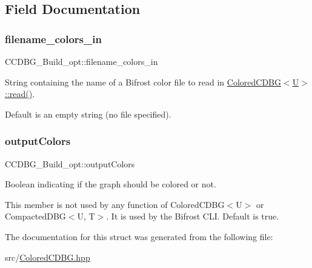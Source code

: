\subsection{Field Documentation}
\mbox{\label{structCCDBG__Build__opt_a5a0ffdd2103dcc0087f99731dcbcdc9f}} 
\subsubsection{\texorpdfstring{filename\+\_\+colors\+\_\+in}{filename\_colors\_in}}
{\footnotesize\ttfamily C\+C\+D\+B\+G\+\_\+\+Build\+\_\+opt\+::filename\+\_\+colors\+\_\+in}



String containing the name of a Bifrost color file to read in \hyperlink{classColoredCDBG_a513ae8190f56a26b088a99e1e33689d8}{Colored\+C\+D\+B\+G$<$\+U$>$\+::read()}. 

Default is an empty string (no file specified). \mbox{\label{structCCDBG__Build__opt_a8139bdba04c0dbb93c653c9a451b05f6}} 
\subsubsection{\texorpdfstring{output\+Colors}{outputColors}}
{\footnotesize\ttfamily C\+C\+D\+B\+G\+\_\+\+Build\+\_\+opt\+::output\+Colors}



Boolean indicating if the graph should be colored or not. 

This member is not used by any function of Colored\+C\+D\+B\+G$<$\+U$>$ or Compacted\+D\+B\+G$<$\+U, T$>$. It is used by the Bifrost C\+LI. Default is true. 

The documentation for this struct was generated from the following file\+:\begin{DoxyCompactItemize}
\item 
src/\hyperlink{ColoredCDBG_8hpp}{Colored\+C\+D\+B\+G.\+hpp}\end{DoxyCompactItemize}
